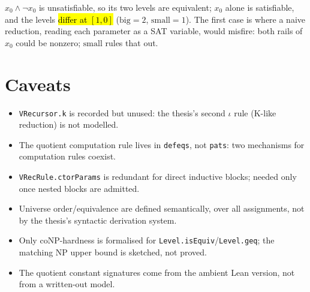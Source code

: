\begin{example}
\label{ex:levelsat-instances}
\leanok
{}

 $x_0 \wedge \neg x_0$ is unsatisfiable, so its two levels are equivalent;
$x_0$ alone is satisfiable, and the levels \hl{differ at $[1,0]$} ($\mathrm{big}=2$,
$\mathrm{small}=1$).
The first case is where a naive reduction, reading each parameter as a SAT
variable, would misfire: both rails of $x_0$ could be nonzero; $\mathrm{small}$ rules
that out.
\end{example}

\section*{Caveats}

\begin{itemize}
\item \texttt{VRecursor.k} is recorded but unused: the thesis's second $\iota$ rule
(K-like reduction) is not modelled.
\item The quotient computation rule lives in \texttt{defeqs}, not \texttt{pats}: two
mechanisms for computation rules coexist.
\item \texttt{VRecRule.ctorParams} is redundant for direct inductive blocks; needed only
once nested blocks are admitted.
\item Universe order/equivalence are defined semantically, over all assignments, not by
the thesis's syntactic derivation system.
\item Only coNP-hardness is formalised for \texttt{Level.isEquiv}/\texttt{Level.geq}; the
matching NP upper bound is sketched, not proved.
\item The quotient constant signatures come from the ambient Lean version, not from a
written-out model.
\end{itemize}
